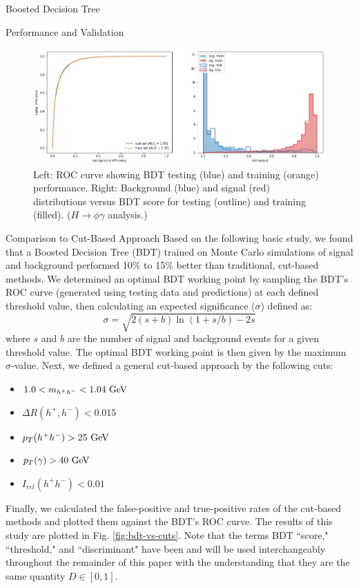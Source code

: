 \begin{section}{Boosted Decision Tree}
\begin{subsection}{Performance and Validation}
\begin{figure}[htb]
\begin{center}
\includegraphics[width=.95\linewidth]{Dissertation/fig/bdt-performance.png}
\end{center}
\caption{Left: ROC curve showing BDT testing (blue) and training (orange) performance. Right: Background (blue) and signal (red) distributions versus BDT score for testing (outline) and training (filled). ($H\rightarrow\phi\gamma$ analysis.)}
\label{fig:bdt-performance}
\end{figure}

\end{subsection}
\begin{subsection}{Comparison to Cut-Based Approach}\label{comp-to-cuts}
Based on the following basic study, we found that a Boosted Decision Tree (BDT) trained on Monte Carlo simulations of signal and background performed 10\% to 15\% better than traditional, cut-based methods. We determined an optimal BDT working point by sampling the BDT's ROC curve (generated using testing data and predictions) at each defined threshold value, then calculating an expected significance ($\sigma$) defined as:
\begin{equation}\label{expsig-eq}
    \sigma = \sqrt{2(s+b)\ln(1+s/b)-2s}
\end{equation}
\noindent where $s$ and $b$ are the number of signal and background events for a given threshold value. The optimal BDT working point is then given by the maximum $\sigma$-value. Next, we defined a general cut-based approach by the following cuts:
\begin{itemize}
    \item $1.0 < m_{h^{+}h^{-}} < 1.04\textnormal{ GeV}$
    \item $\Delta R(h^{+}, h^{-}) < 0.015$
    \item $p_{T}(h^{+}h^{-}) > 25\textnormal{ GeV}$
    \item $p_{T}(\gamma) > 40\textnormal{ GeV}$
    \item $I_{rel}(h^{+}h^{-}) < 0.01$
\end{itemize}
\noindent Finally, we calculated the false-positive and true-positive rates of the cut-based methods and plotted them against the BDT's ROC curve. The results of this study are plotted in Fig. \ref{fig:bdt-vs-cuts}. Note that the terms BDT ``score," ``threshold," and ``discriminant" have been and will be used interchangeably throughout the remainder of this paper with the understanding that they are the same quantity $D \in [0,1]$.


\end{subsection}
\end{section}

